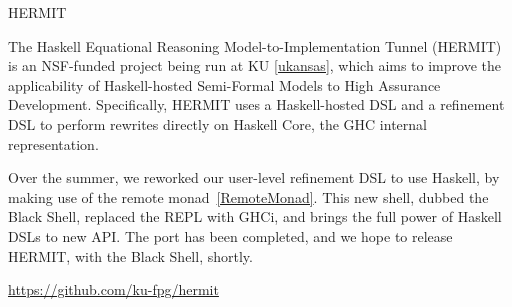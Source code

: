 \begin{hcarentry}[updated]{HERMIT}
\label{HERMIT}
\makeheader

The Haskell Equational Reasoning Model-to-Implementation Tunnel
(HERMIT) is an NSF-funded project being run at KU \cref{ukansas}, which aims to improve the
applicability of Haskell-hosted Semi-Formal Models to High Assurance Development.
Specifically, HERMIT uses a Haskell-hosted DSL
and a refinement DSL to perform rewrites directly on Haskell Core,
the GHC internal representation.

Over the summer, we reworked our user-level refinement DSL to use Haskell,
by making use of the remote monad~\cref{RemoteMonad}. This new
shell, dubbed the Black Shell, replaced the REPL with GHCi,
and brings the full power of Haskell DSLs to new API. The
port has been completed, and we hope to release HERMIT, with the Black Shell, shortly.

\FurtherReading
  \url{https://github.com/ku-fpg/hermit}
\end{hcarentry}
